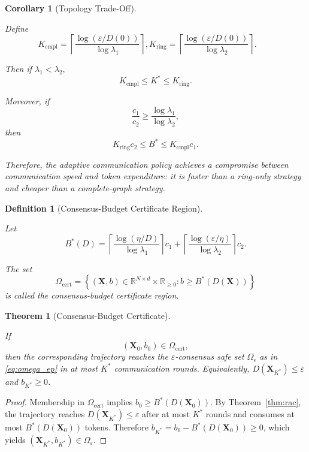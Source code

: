 \documentclass[journal,twoside,web]{ieeecolor_no_firstpage_logo}
\newtheorem{definition}{Definition}
\newtheorem{theorem}{Theorem}
\newtheorem{corollary}{Corollary}
\begin{document}
\begin{corollary}[Topology Trade-Off]
\label{cor:tradeoff}

Define
\[
K_{\mathrm{cmpl}}
=
\left\lceil
\frac{\log(\varepsilon/D(0))}
{\log\lambda_1}
\right\rceil,
K_{\mathrm{ring}}
=
\left\lceil
\frac{\log(\varepsilon/D(0))}
{\log\lambda_2}
\right\rceil.
\qquad
\]

Then if $\lambda_1 < \lambda_2,$
\[
K_{\mathrm{cmpl}}
\le
K^*
\le
K_{\mathrm{ring}}.
\]

Moreover, if
\[
\frac{c_1}{c_2}
\ge
\frac{\log\lambda_1}{\log\lambda_2},
\]
then
\[
K_{\mathrm{ring}}c_2
\le
B^*
\le
K_{\mathrm{cmpl}}c_1.
\]

Therefore, the adaptive communication policy achieves a compromise
between communication speed and token expenditure: it is faster than
a ring-only strategy and cheaper than a complete-graph strategy. 
\end{corollary}

\begin{definition}[Consensus-Budget Certificate Region]
\label{def:cert}

Let
\[
B^*(D)
=
\left\lceil
\frac{\log(\eta/D)}
{\log\lambda_1}
\right\rceil c_1
+
\left\lceil
\frac{\log(\varepsilon/\eta)}
{\log\lambda_2}
\right\rceil c_2.
\]

The set
\[
\Omega_{\mathrm{cert}}
=
\left\{
(\mathbf{X},b)
\in
\mathbb R^{N\times d}\times\mathbb R_{\ge0}
:
b\ge B^*(D(\mathbf{X}))
\right\}
\]
is called the consensus-budget certificate region.
\end{definition}

\begin{theorem}[Consensus-Budget Certificate]
\label{thm:cert}

If
\[
(\mathbf{X}_0,b_0)\in\Omega_{\mathrm{cert}},
\]
then the corresponding trajectory reaches the
$\varepsilon$-consensus safe set $\Omega_\epsilon$ as in \eqref{eq:omega_ep} in at most $K^*$ communication rounds. Equivalently, $D(\mathbf{X}_{K^*})\le\varepsilon $ and $ b_{K^*}\ge0$.
\end{theorem}

\begin{proof} Membership in $\Omega_{\mathrm{cert}}$ implies $b_0 \ge B^*(D(\mathbf{X}_0)).$ By Theorem~\ref{thm:rac}, the trajectory reaches $
D(\mathbf{X}_{K^*})\le\varepsilon $ after at most $K^*$ rounds and consumes at most $B^*(D(\mathbf{X}_0))$ tokens. Therefore $ b_{K^*}
= b_0-B^*(D(\mathbf{X}_0)) \ge0$, which yields $(\mathbf{X}_{K^*},b_{K^*})
\in
\Omega_\varepsilon.
$
\end{proof}
\end{document}
